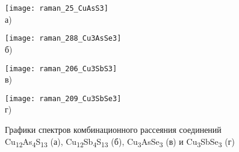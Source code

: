 \begin{figure}[b!]
  \begin{minipage}[ht]{0.5\linewidth}\centering
    \texttt{[image: raman\_25\_CuAsS3]} \\ а)
  \end{minipage}
  \hfill
  \begin{minipage}[ht]{0.5\linewidth}\centering
    \texttt{[image: raman\_288\_Cu3AsSe3]} \\ б)
  \end{minipage}
\vfill
  \begin{minipage}[ht]{0.5\linewidth}\centering
    \texttt{[image: raman\_206\_Cu3SbS3]} \\ в)
  \end{minipage}
  \hfill
  \begin{minipage}[ht]{0.5\linewidth}\centering
    \texttt{[image: raman\_209\_Cu3SbSe3]} \\ г)
  \end{minipage}

      \caption[Графики спектров комбинационного рассеяния соединений Cu\textsubscript{12}As\textsubscript{4}S\textsubscript{13} (а), Cu\textsubscript{12}Sb\textsubscript{4}S\textsubscript{13} (б), Cu\textsubscript{3}AsSe\textsubscript{3} (в) и Cu\textsubscript{3}SbSe\textsubscript{3} (г)]{Графики спектров комбинационного рассеяния соединений Cu\textsubscript{12}As\textsubscript{4}S\textsubscript{13} (а), Cu\textsubscript{12}Sb\textsubscript{4}S\textsubscript{13} (б), Cu\textsubscript{3}AsSe\textsubscript{3} (в) и Cu\textsubscript{3}SbSe\textsubscript{3} (г)}
    \label{img:figure_raman}
\end{figure}


